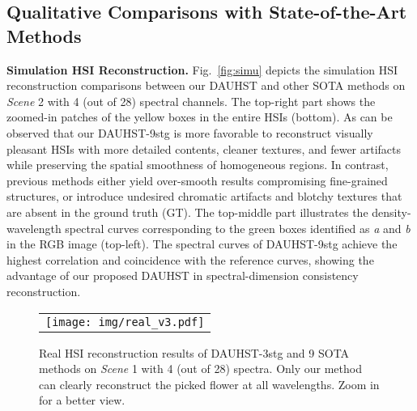 \documentclass{article}
\begin{document}
\subsection{Qualitative Comparisons with State-of-the-Art Methods}
\vspace{-1.5mm}
\textbf{Simulation HSI Reconstruction.} Fig.~\ref{fig:simu} depicts the simulation HSI reconstruction comparisons between our DAUHST and other SOTA methods on \emph{Scene} 2 with 4 (out of 28) spectral channels. The top-right part shows the zoomed-in patches of the yellow boxes in the entire HSIs (bottom). As can be observed that our DAUHST-9stg is more favorable to reconstruct visually pleasant HSIs with more detailed contents, cleaner textures, and fewer  artifacts while  preserving the spatial smoothness of homogeneous regions. In contrast, previous methods either yield over-smooth results compromising fine-grained structures, or introduce undesired chromatic artifacts and blotchy textures that are absent in the ground truth (GT). The top-middle part illustrates the density-wavelength spectral curves corresponding to the green boxes identified as \emph{a} and \emph{b} in the RGB image (top-left). The spectral curves of DAUHST-9stg achieve the highest correlation and coincidence with the reference curves, showing the advantage of our proposed DAUHST in spectral-dimension
consistency reconstruction. 

\begin{figure*}[t]
	\begin{center}
		\begin{tabular}[t]{c} \hspace{-3.4mm}
			\texttt{[image: img/real\_v3.pdf]}
		\end{tabular}
	\end{center}
	\vspace*{-4mm}
	\caption{\small Real HSI reconstruction results of DAUHST-3stg and 9 SOTA methods on  \emph{Scene} 1 with 4 (out of 28) spectra. Only our method can clearly reconstruct the picked flower at all wavelengths. 
		Zoom in for a better view. }
	\label{fig:real}
	\vspace{-5mm}
\end{figure*}
\end{document}
